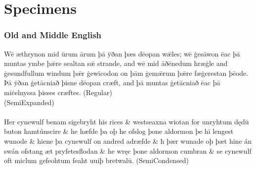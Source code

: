 
\chapter{Specimens}\hypertarget{specimens}{}

\subsection*{Old and Middle English}

{\noindent\jRegular{}Wē æthrynon mid ūrum ārum þā ȳðan þæs dēopan wǣles; wē
ġesāwon ēac þā muntas ymbe þǣre sealtan sǣ strande, and wē mid
āðēnedum hræġle and ġesundfullum windum þǣr ġewīcodon on þām
ġemǣrum þǣre fæġerestan þēode. Þā ȳðan ġetācniað þisne dēopan
cræft, and þā muntas ġetācniað ēac þā miċelnyssa þisses cræftes.} (Regular)\\

 (SemiExpanded)\\

\\[1ex]
{\jSmCond{}\InsularLetterForms\jcv{\jcvEogonek}
Her cynewulf benam sigebryht his rices \& westseaxna wiotan for
un\-ryht\-um dędū buton hamtúnscire \& he hæfde þa oþ he ofslog
þone aldormon þe hī lengest wunode \& hiene þa cynewulf on
andred adræfde \& ħ þær wunade oþ þæt hine án swán ofstang
æt pryfetesflodan \& he wręc þone aldormon cumbran \& se cynewulf
oft miclum gefeohtum feaht uuiþ bretwalū.} (SemiCondensed)

